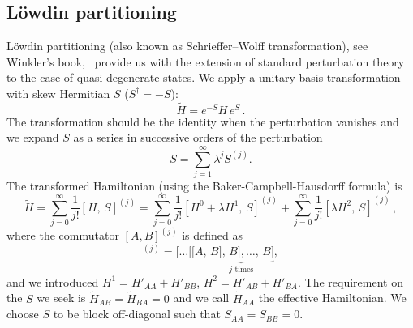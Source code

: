 \documentclass[10pt, onecolumn, aps, prb, superscriptaddress, floatfix, showpacs, notitlepage]{revtex4-1}
\begin{document}
\subsection{L\"owdin partitioning}
\label{sec:lowdin}
L\"owdin partitioning (also known as Schrieffer–Wolff transformation), see Winkler's book,~\cite{winkler} provide us with the extension of standard perturbation theory to the case of quasi-degenerate states.
We apply a unitary basis transformation with skew Hermitian $S$ ($S^\dagger = -S$):
\begin{equation}
\tilde{H} = e^{-S} H \, e^{S}\,.
\end{equation}
The transformation should be the identity when the perturbation vanishes and we expand $S$ as a series in successive orders of the perturbation
\begin{equation}
S = \sum_{j = 1}^{\infty} \lambda^j S^{(j)}.
\end{equation}
The transformed Hamiltonian (using the Baker-Campbell-Hausdorff formula) is
\begin{equation}
\tilde{H}
    = \sum_{j=0}^{\infty}\frac{1}{j!} [H,\,S]^{(j)}
    = \sum_{j=0}^{\infty}\frac{1}{j!} [H^0 + \lambda H^1,\,S]^{(j)}
    + \sum_{j=0}^{\infty}\frac{1}{j!} [\lambda H^2,\,S]^{(j)}\,,
\end{equation}
where the commutator $[A, B]^{(j)}$ is defined as
\begin{equation}
[A, B]^{(j)} = [\ldots[[A,\underbrace{\,B],\,B],\ldots,\,B]}_\text{$j$ times},
\end{equation}
and we introduced $H^1 = H'_{AA} + H'_{BB}$, $H^2 = H'_{AB} + H'_{BA}$.
The requirement on the $S$ we seek is $\tilde{H}_{AB} = \tilde{H}_{BA} = 0$ and we call $\tilde{H}_{AA}$ the effective Hamiltonian.
We choose $S$ to be block off-diagonal such that $S_{AA} = S_{BB} = 0$.
\end{document}
